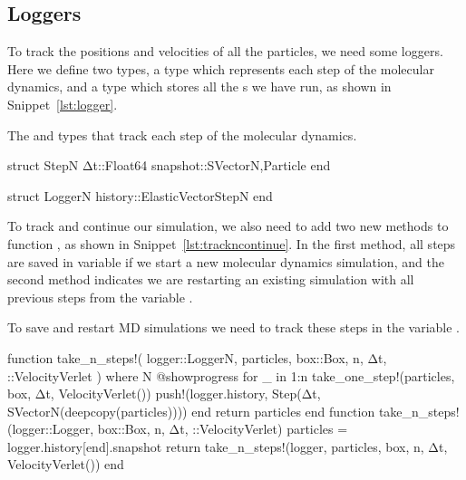 \subsection{Loggers}

To track the positions and velocities of all the particles, we need some loggers.
Here we define two types, a  type which represents each step of the molecular
dynamics, and a  type which stores all the s we have run,
as shown in Snippet~\ref{lst:logger}.

\begin{algorithm}
    \caption{The  and  types that track each step of the
        molecular dynamics.}
    \label{lst:logger}
    \begin{juliacode}
        struct Step{N}
            Δt::Float64
            snapshot::SVector{N,Particle}
        end

        struct Logger{N}
            history::ElasticVector{Step{N}}
        end
    \end{juliacode}
\end{algorithm}

To track and continue our simulation, we also need to add two new methods to function
, as shown in Snippet~\ref{lst:trackncontinue}.
In the first method, all steps are saved in variable  if we start a new
molecular dynamics simulation, and the second method indicates we are restarting an
existing simulation with all previous steps from the variable .

\begin{algorithm}
    \caption{To save and restart MD simulations we need to track these steps
        in the variable .}
    \label{lst:trackncontinue}
    \begin{juliacode}
        function take_n_steps!(
            logger::Logger{N}, particles, box::Box, n, Δt, ::VelocityVerlet
        ) where {N}
            @showprogress for _ in 1:n
                take_one_step!(particles, box, Δt, VelocityVerlet())
                push!(logger.history, Step(Δt, SVector{N}(deepcopy(particles))))
            end
            return particles
        end
        function take_n_steps!(logger::Logger, box::Box, n, Δt, ::VelocityVerlet)
            particles = logger.history[end].snapshot
            return take_n_steps!(logger, particles, box, n, Δt, VelocityVerlet())
        end
    \end{juliacode}
\end{algorithm}

